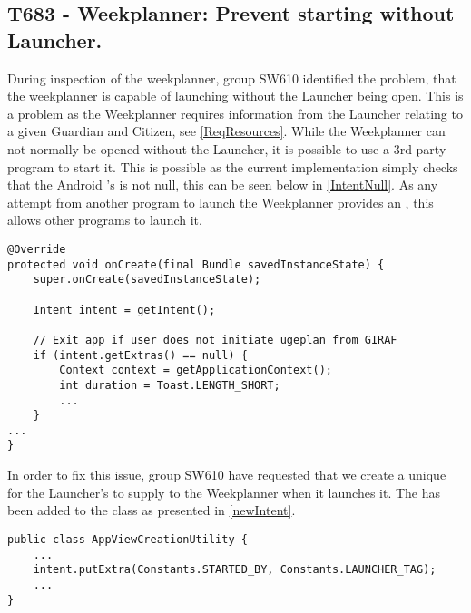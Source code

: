 \subsection{T683 - Weekplanner: Prevent starting without Launcher.} 
During inspection of the weekplanner, group SW610 identified the problem, that
the weekplanner is capable of launching without the Launcher being open. This
is a problem as the Weekplanner requires information from the Launcher relating
to a given Guardian and Citizen, see \autoref{ReqResources}. While the
Weekplanner can not normally be opened without the Launcher, it is possible to
use a 3rd party program to start it. This is possible as the current
implementation simply checks that the Android 's  is
not null, this can be seen below in \autoref{IntentNull}. As any attempt from
another program to launch the Weekplanner provides an , this
allows other programs to launch it.\nl

\begin{minipage}[H]{\linewidth}
\begin{lstlisting}[caption = Current implementation checks that the Intent
Extras is not null., label = IntentNull] 
@Override
protected void onCreate(final Bundle savedInstanceState) {
	super.onCreate(savedInstanceState);

    Intent intent = getIntent();

   	// Exit app if user does not initiate ugeplan from GIRAF
    if (intent.getExtras() == null) {               
    	Context context = getApplicationContext();
        int duration = Toast.LENGTH_SHORT;
        ...
    }
...
}
\end{lstlisting}
\end{minipage}

In order to fix this issue, group SW610 have requested that we create a unique
 for the Launcher's  to supply to the Weekplanner
when it launches it. The  has been added to the
 class as presented in \autoref{newIntent}.\nl

\begin{minipage}[H]{\linewidth}
\begin{lstlisting}[caption = New unique \textc{Intent} for the Launcher., label = newIntent] 
public class AppViewCreationUtility {
	...
	intent.putExtra(Constants.STARTED_BY, Constants.LAUNCHER_TAG);
	...
}
\end{lstlisting}
\end{minipage}

